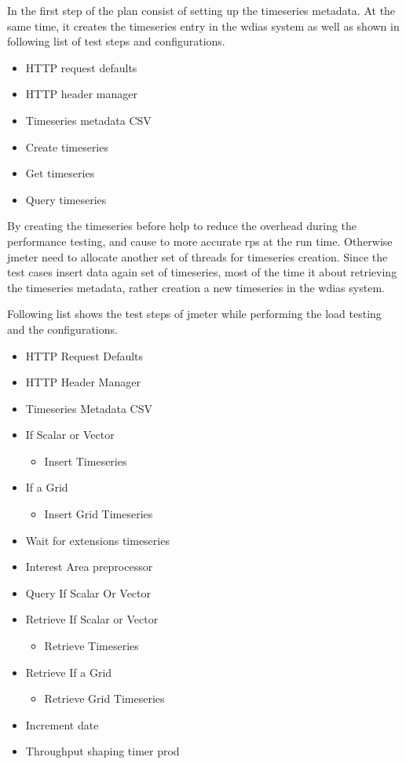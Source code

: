 In the first step of the plan consist of setting up the timeseries metadata. At the same time, it creates the timeseries entry in the \acrshort{wdias} system as well as shown in following list of test steps and configurations.

\begin{itemize}
    \item HTTP request defaults
    \item HTTP header manager
    \item Timeseries metadata CSV
    \item Create timeseries
    \item Get timeseries
    \item Query timeseries
\end{itemize}

By creating the timeseries before help to reduce the overhead during the performance testing, and cause to more accurate \acrshort{rps} at the run time.
Otherwise \acrshort{jmeter} need to allocate another set of threads for timeseries creation. Since the test cases insert data again set of timeseries, most of the time it about retrieving the timeseries metadata, rather creation a new timeseries in the \acrshort{wdias} system.

Following list shows the test steps of \acrshort{jmeter} while performing the load testing and the configurations.

\begin{itemize}
    \item HTTP Request Defaults
    \item HTTP Header Manager
    \item Timeseries Metadata CSV
    \item If Scalar or Vector
        \begin{itemize}
            \item Insert Timeseries
        \end{itemize}
    \item If a Grid
    \begin{itemize}
        \item Insert Grid Timeseries
    \end{itemize}
    \item Wait for extensions timeseries
    \item Interest Area preprocessor
    \item Query If Scalar Or Vector
    \item Retrieve If Scalar or Vector
        \begin{itemize}
            \item Retrieve Timeseries
        \end{itemize}
    \item Retrieve If a Grid
    \begin{itemize}
        \item Retrieve Grid Timeseries
    \end{itemize}
    \item Increment date
    \item Throughput shaping timer prod
\end{itemize}

